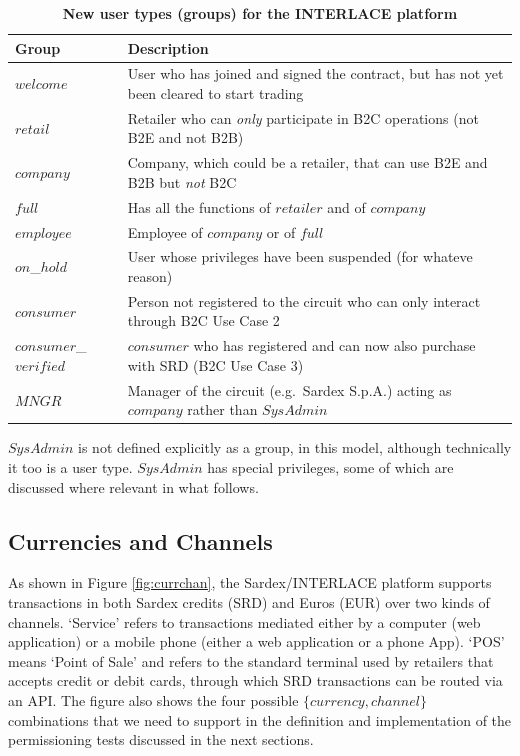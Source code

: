 \setlength{\tabcolsep}{10pt}
\begin{table}[h]
\begin{centering}
\small
{
\begin{tabular}{| l | l | }
\hline
\textbf{Group}	& \textbf{Description} \\
\hline
$welcome$ & User who has joined and signed the contract, but has not yet been cleared to start trading \\
\hline
$retail$ & Retailer who can \emph{only} participate in B2C operations (not B2E and not B2B) \\
\hline
$company$ & Company, which could be a retailer, that can use B2E and B2B but \emph{not} B2C \\
\hline
$full$ & Has all the functions of $retailer$ and of $company$ \\
\hline
$employee$ & Employee of $company$ or of $full$ \\
\hline
$on$\_$hold$ & User whose privileges have been suspended (for whateve reason) \\
\hline
$consumer$ & Person not registered to the circuit who can only interact through B2C Use Case 2 \\
\hline
$consumer$\_$verified$ & $consumer$ who has registered and can now also purchase with SRD (B2C Use Case 3)  \\
\hline
$MNGR$ & Manager of the circuit (e.g.\ Sardex S.p.A.) acting as $company$ rather than $SysAdmin$ \\
\hline
\end{tabular}
}
\caption{\small\textbf{New user types (groups) for the INTERLACE platform}}
\label{tab:groups}
\end{centering}
\end{table}
\vspace{-0.5cm}

$SysAdmin$ is not defined explicitly as a group, in this model, although technically it too is a user type. $SysAdmin$ has special privileges, some of which are discussed where relevant in what follows.

\subsection{Currencies and Channels}
As shown in Figure \ref{fig:currchan}, the Sardex/INTERLACE platform supports transactions in both Sardex credits (SRD) and Euros (EUR) over two kinds of channels. `Service' refers to transactions mediated either by a computer (web application) or a mobile phone (either a web application or a phone App). `POS' means `Point of Sale' and refers to the standard terminal used by retailers that accepts credit or debit cards, through which SRD transactions can be routed via an API. The figure also shows the four possible $\{ currency, channel \}$ combinations that we need to support in the definition and implementation of the permissioning tests discussed in the next sections.

